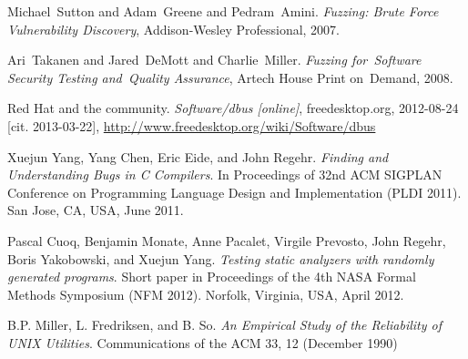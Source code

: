 \documentclass[conference]{IEEEtran}
\begin{document}
%
%
%
\begin{thebibliography}{1}

Michael~Sutton and Adam~Greene and Pedram~Amini. \emph{Fuzzing: Brute Force
Vulnerability Discovery}, Addison-Wesley Professional, 2007.

Ari~Takanen and Jared~DeMott and Charlie~Miller. \emph{Fuzzing for~Software
Security Testing and~Quality Assurance}, Artech House Print on~Demand, 2008.

Red Hat and the community. \emph{Software/dbus [online]}, freedesktop.org,
2012-08-24 [cit. 2013-03-22],
\url{http://www.freedesktop.org/wiki/Software/dbus}

Xuejun Yang, Yang Chen, Eric Eide, and John Regehr. \emph{Finding and
Understanding Bugs in C Compilers}. In Proceedings of 32nd ACM SIGPLAN
Conference on Programming Language Design and Implementation (PLDI 2011). San Jose, CA, USA, June 2011.

Pascal Cuoq, Benjamin Monate, Anne Pacalet, Virgile Prevosto, John Regehr, Boris
Yakobowski, and Xuejun Yang. \emph{Testing static analyzers with randomly
generated programs}. Short paper in Proceedings of the 4th NASA Formal Methods Symposium (NFM 2012). Norfolk, Virginia, USA, April 2012.

B.P. Miller, L. Fredriksen, and B. So. \emph{An Empirical
Study of the Reliability of UNIX Utilities}. Communications of the ACM 33, 12
(December 1990)

\end{thebibliography}

\end{document}
